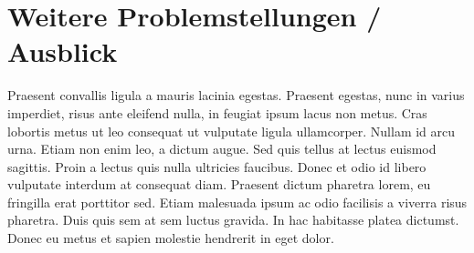 \chapter{Weitere Problemstellungen / Ausblick}

  Praesent convallis ligula a mauris lacinia egestas. Praesent egestas, nunc in varius imperdiet, risus ante eleifend nulla, in feugiat ipsum lacus non metus. Cras lobortis metus ut leo consequat ut vulputate ligula ullamcorper. Nullam id arcu urna. Etiam non enim leo, a dictum augue. Sed quis tellus at lectus euismod sagittis. Proin a lectus quis nulla ultricies faucibus. Donec et odio id libero vulputate interdum at consequat diam. Praesent dictum pharetra lorem, eu fringilla erat porttitor sed. Etiam malesuada ipsum ac odio facilisis a viverra risus pharetra. Duis quis sem at sem luctus gravida. In hac habitasse platea dictumst. Donec eu metus et sapien molestie hendrerit in eget dolor.
